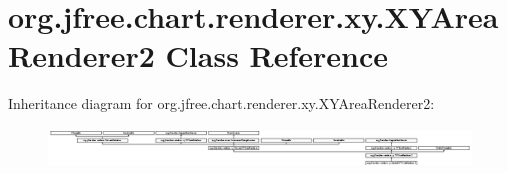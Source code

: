 \hypertarget{classorg_1_1jfree_1_1chart_1_1renderer_1_1xy_1_1_x_y_area_renderer2}{}\section{org.\+jfree.\+chart.\+renderer.\+xy.\+X\+Y\+Area\+Renderer2 Class Reference}
\label{classorg_1_1jfree_1_1chart_1_1renderer_1_1xy_1_1_x_y_area_renderer2}
Inheritance diagram for org.\+jfree.\+chart.\+renderer.\+xy.\+X\+Y\+Area\+Renderer2\+:\begin{figure}[H]
\begin{center}
\leavevmode
\includegraphics[height=1.067073cm]{classorg_1_1jfree_1_1chart_1_1renderer_1_1xy_1_1_x_y_area_renderer2}
\end{center}
\end{figure}
